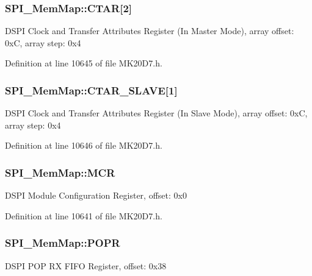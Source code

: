 \subsubsection[{\texorpdfstring{C\+T\+AR}{CTAR}}]{ S\+P\+I\+\_\+\+Mem\+Map\+::\+C\+T\+AR\mbox{[}2\mbox{]}}\hypertarget{struct_s_p_i___mem_map_afe52c1ebf9e5971e43fdfea50cf16a48}{}\label{struct_s_p_i___mem_map_afe52c1ebf9e5971e43fdfea50cf16a48}
D\+S\+PI Clock and Transfer Attributes Register (In Master Mode), array offset\+: 0xC, array step\+: 0x4 

Definition at line 10645 of file M\+K20\+D7.\+h.

\subsubsection[{\texorpdfstring{C\+T\+A\+R\+\_\+\+S\+L\+A\+VE}{CTAR_SLAVE}}]{ S\+P\+I\+\_\+\+Mem\+Map\+::\+C\+T\+A\+R\+\_\+\+S\+L\+A\+VE\mbox{[}1\mbox{]}}\hypertarget{struct_s_p_i___mem_map_a4824e400ced2bf2bd5c89e95e7ef55d6}{}\label{struct_s_p_i___mem_map_a4824e400ced2bf2bd5c89e95e7ef55d6}
D\+S\+PI Clock and Transfer Attributes Register (In Slave Mode), array offset\+: 0xC, array step\+: 0x4 

Definition at line 10646 of file M\+K20\+D7.\+h.

\subsubsection[{\texorpdfstring{M\+CR}{MCR}}]{ S\+P\+I\+\_\+\+Mem\+Map\+::\+M\+CR}\hypertarget{struct_s_p_i___mem_map_a6474aa986b81a5477bbe4cb6a2dfe377}{}\label{struct_s_p_i___mem_map_a6474aa986b81a5477bbe4cb6a2dfe377}
D\+S\+PI Module Configuration Register, offset\+: 0x0 

Definition at line 10641 of file M\+K20\+D7.\+h.

\subsubsection[{\texorpdfstring{P\+O\+PR}{POPR}}]{ S\+P\+I\+\_\+\+Mem\+Map\+::\+P\+O\+PR}\hypertarget{struct_s_p_i___mem_map_a04b56f8ca2e50d92647fc7b7e2d98715}{}\label{struct_s_p_i___mem_map_a04b56f8ca2e50d92647fc7b7e2d98715}
D\+S\+PI P\+OP RX F\+I\+FO Register, offset\+: 0x38 

